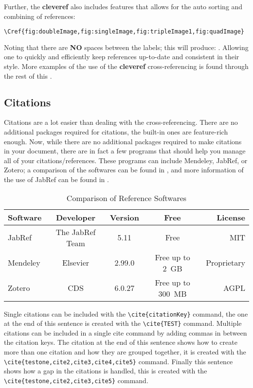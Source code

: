 			Further, the \textbf{cleveref} also includes features that allows for the auto sorting and combining of references:
			\begin{lstlisting}[style=LaTeXStyle]
				\Cref{fig:doubleImage,fig:singleImage,fig:tripleImage1,fig:quadImage}
			\end{lstlisting}
			Noting that there are \textbf{NO} spaces between the labels; this will produce: . 
			Allowing one to quickly and efficiently keep references up-to-date and consistent in their style.
			More examples of the use of the \textbf{cleveref} cross-referencing is found through the rest of this .
		\subsection{Citations}\label{subsec:citations}
			Citations are a lot easier than dealing with the cross-referencing.
			There are no additional packages required for citations, the built-in ones are feature-rich enough.
			Now, while there are no additional packages required to make citations in your document, there are in fact a few programs that should help you manage all of your citations/references.
			These programs can include Mendeley, JabRef, or Zotero; a comparison of the softwares can be found in , and more information of the use of JabRef can be found in .
			\begin{table}[htbp]
				\centering
				\caption{Comparison of Reference Softwares}
				\label{tab:refSoftware}%
				\begin{tabularx}{0.9\textwidth}{Lcccr}
					\toprule
						Software & Developer & Version & Free & License \\
					\midrule
						JabRef   & The JabRef Team & 5.11   & Free   & MIT \\
						Mendeley & Elsevier          & 2.99.0 & {Free up to 2 GB} & Proprietary \\
						Zotero   & CDS               & 6.0.27 & {Free  up to 300 MB} & AGPL \\
					\bottomrule
				\end{tabularx}%
			\end{table}%
			Single citations can be included with the \lstinline|\cite{citationKey}| command, the one at the end of this sentence is created with the \lstinline|\cite{TEST}| command\cite{TEST}. 
			Multiple citations can be included in a single cite command by adding commas in between the citation keys. 
			The citation at the end of this sentence shows how to create more than one citation and how they are grouped together, it is created with the \lstinline|\cite{testone,cite2,cite3,cite4,cite5}| command\cite{testone,cite2,cite3,cite4,cite5}.
			Finally this sentence shows how a gap in the citations is handled, this is created with the \lstinline|\cite{testone,cite2,cite3,cite5}| command\cite{testone,cite2,cite3,cite5}. 
